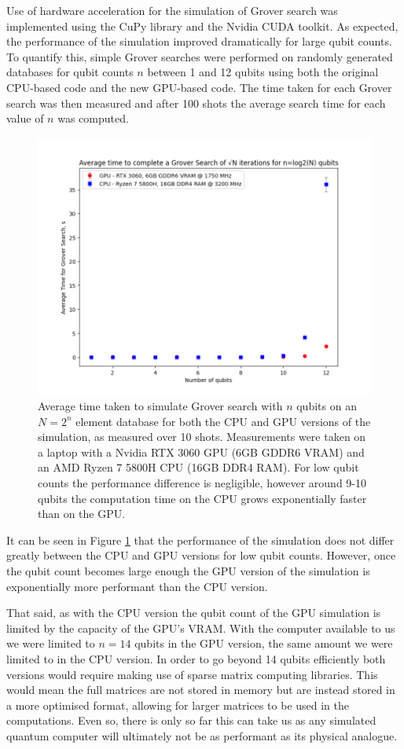 \documentclass{article}[11pt]
\begin{document}
Use of hardware acceleration for the simulation of Grover search was implemented using the CuPy library and the Nvidia CUDA toolkit.\cite{cupy2017,cuda} As expected, the performance of the simulation improved dramatically for large qubit counts. To quantify this, simple Grover searches were performed on randomly generated databases for qubit counts $n$ between 1 and 12 qubits using both the original CPU-based code and the new GPU-based code. The time taken for each Grover search was then measured and after 100 shots the average search time for each value of $n$ was computed.
\begin{figure}[H]
\centering
\includegraphics[width=\textwidth]{Pictures/CPU vs GPU full.png}
\caption{Average time taken to simulate Grover search with $n$ qubits on an $N=2^n$ element database for both the CPU and GPU versions of the simulation, as measured over 10 shots. Measurements were taken on a laptop with a Nvidia RTX 3060 GPU (6GB GDDR6 VRAM) and an AMD Ryzen 7 5800H CPU (16GB DDR4 RAM). For low qubit counts the performance difference is negligible, however around 9-10 qubits the computation time on the CPU grows exponentially faster than on the GPU.}
\label{fig:GPU_graph}
\end{figure}
It can be seen in Figure \ref{fig:GPU_graph} that the performance of the simulation does not differ greatly between the CPU and GPU versions for low qubit counts. However, once the qubit count becomes large enough the GPU version of the simulation is exponentially more performant than the CPU version.

That said, as with the CPU version the qubit count of the GPU simulation is limited by the capacity of the GPU's VRAM. With the computer available to us we were limited to $n=14$ qubits in the GPU version, the same amount we were limited to in the CPU version. In order to go beyond 14 qubits efficiently both versions would require making use of sparse matrix computing libraries. This would mean the full matrices are not stored in memory but are instead stored in a more optimised format, allowing for larger matrices to be used in the computations.\cite{candela} Even so, there is only so far this can take us as any simulated quantum computer will ultimately not be as performant as its physical analogue.
\end{document}
